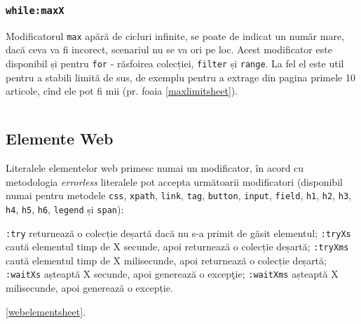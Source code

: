 \subsubsection{\texttt{while:maxX}}

Modificatorul \texttt{max} apără de cicluri infinite, se poate de indicat un număr mare, dacă ceva va fi incorect, scenariul nu se va ori pe loc. Acest modificator este disponibil și pentru \texttt{for} - răsfoirea colecției, \texttt{filter} și \texttt{range}. La fel el este util pentru a stabili limită de sus, de exemplu pentru a extrage din pagina primele 10 articole, cînd ele pot fi mii (pr. foaia \ref{maxlimitsheet}).

\begin{sourcecode}
    \label{maxlimitsheet}
    \inputminted[linenos]{icl}{../sources/maxlimitsheet.icL}
\end{sourcecode}

\subsection{Elemente Web}

Literalele elementelor web primesc numai un modificator, în acord cu metodologia {\it errorless} literalele pot accepta următoarii modificatori (disponibil numai pentru metodele \texttt{css}, \texttt{xpath}, \texttt{link}, \texttt{tag}, \texttt{button}, \texttt{input}, \texttt{field}, \texttt{h1}, \texttt{h2}, \texttt{h3}, \texttt{h4}, \texttt{h5}, \texttt{h6}, \texttt{legend} și \texttt{span}):
\begin{icItems}
	\texttt{:try} returnează o colecție deșartă dacă nu s-a primit de găsit elementul;
	\texttt{:tryXs} caută elementul timp de X secunde, apoi returnează o colecție deșartă;
	\texttt{:tryXms} caută elementul timp de X milisecunde, apoi returnează o colecție deșartă;
	\texttt{:waitXs} așteaptă X secunde, apoi generează o excepţie;
	\texttt{:waitXms} așteaptă X milisecunde, apoi generează o excepție.
\end{icItems}

\ref{webelementsheet}.

\begin{sourcecode}
    \label{webelementsheet}
    \inputminted[linenos]{icl}{../sources/webelementsheet.icL}
\end{sourcecode}


